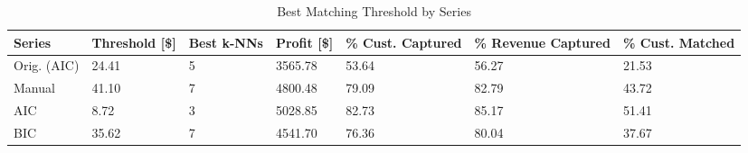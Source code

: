 \begin{table}[ht]
\centering
\caption{Best Matching Threshold by Series} 
\label{tab:series_max}
\begin{tabular}{>{\centering\let\newline\\\arraybackslash\hspace{0pt}}m{2.50cm}>{\centering\let\newline\\\arraybackslash\hspace{0pt}}m{2.00cm}>{\centering\let\newline\\\arraybackslash\hspace{0pt}}m{1.50cm}>{\centering\let\newline\\\arraybackslash\hspace{0pt}}m{2.00cm}>{\centering\let\newline\\\arraybackslash\hspace{0pt}}m{2.00cm}>{\centering\let\newline\\\arraybackslash\hspace{0pt}}m{2.00cm}>{\centering\let\newline\\\arraybackslash\hspace{0pt}}m{2.00cm}}
  \hline
Series & Threshold [\$] & Best k-NNs & Profit [\$] & \% Cust. Captured & \% Revenue Captured & \% Cust. Matched \\ 
  \hline
Orig. (AIC) & 24.41 &   5 & 3565.78 & 53.64 & 56.27 & 21.53 \\ 
  Manual & 41.10 &   7 & 4800.48 & 79.09 & 82.79 & 43.72 \\ 
  AIC & 8.72 &   3 & 5028.85 & 82.73 & 85.17 & 51.41 \\ 
  BIC & 35.62 &   7 & 4541.70 & 76.36 & 80.04 & 37.67 \\ 
   \hline
\end{tabular}
\end{table}
